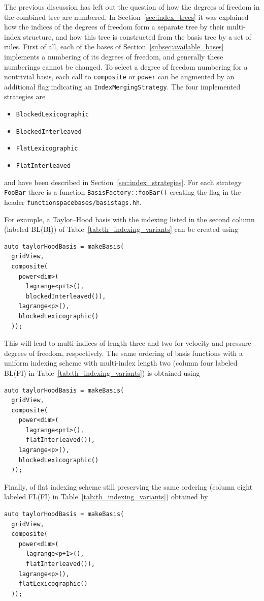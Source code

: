\documentclass[a4paper,10pt,headings=normal,bibliography=totoc]{scrartcl}
\newcommand{\cpp}[1]{\lstinline[basicstyle=\ttfamily]!#1!}
\newcommand{\file}[1]{\texttt{#1}}
\begin{document}
The previous discussion has left out the question of how the degrees of freedom in the combined tree
are numbered.  In Section~\ref{sec:index_trees} it was explained how the indices
of the degrees of freedom form a separate tree by their multi-index structure, and how this tree
is constructed from the basis tree by a set of rules.  First of all, each of the bases of
Section~\ref{subsec:available_bases} implements a numbering of its degrees of freedom,
and generally these numberings cannot be changed.
To select a degree of freedom numbering for a nontrivial basis,
each call to \cpp{composite} or \cpp{power} can be augmented by an additional
flag indicating an \cpp{IndexMergingStrategy}. The four implemented strategies are
\begin{itemize}
  \item
    \cpp{BlockedLexicographic}
  \item
    \cpp{BlockedInterleaved}
  \item
    \cpp{FlatLexicographic}
  \item
    \cpp{FlatInterleaved}
\end{itemize}
and have been described in Section~\ref{sec:index_strategies}.
For each strategy \cpp{FooBar} there is a function \cpp{BasisFactory::fooBar()} creating
the flag in the header \file{functionspacebases/basistags.hh}.

For example, a Taylor--Hood basis with the indexing listed in the
second column (labeled BL(BI)) of Table~\ref{tab:th_indexing_variants} can be created using
\begin{lstlisting}[style=Example]
auto taylorHoodBasis = makeBasis(
  gridView,
  composite(
    power<dim>(
      lagrange<p+1>(),
      blockedInterleaved()),
    lagrange<p>(),
    blockedLexicographic()
  ));
\end{lstlisting}
This will lead to multi-indices of length three and two
for velocity and pressure degrees of freedom, respectively.
The same ordering of basis functions with a uniform indexing scheme
with multi-index length two (column four labeled BL(FI) in Table~\ref{tab:th_indexing_variants}) is obtained using
\begin{lstlisting}[style=Example]
auto taylorHoodBasis = makeBasis(
  gridView,
  composite(
    power<dim>(
      lagrange<p+1>(),
      flatInterleaved()),
    lagrange<p>(),
    blockedLexicographic()
  ));
\end{lstlisting}
Finally, of flat indexing scheme still preserving the same ordering
(column eight labeled FL(FI) in Table~\ref{tab:th_indexing_variants})
obtained by
\begin{lstlisting}[style=Example]
auto taylorHoodBasis = makeBasis(
  gridView,
  composite(
    power<dim>(
      lagrange<p+1>(),
      flatInterleaved()),
    lagrange<p>(),
    flatLexicographic()
  ));
\end{lstlisting}
\end{document}
